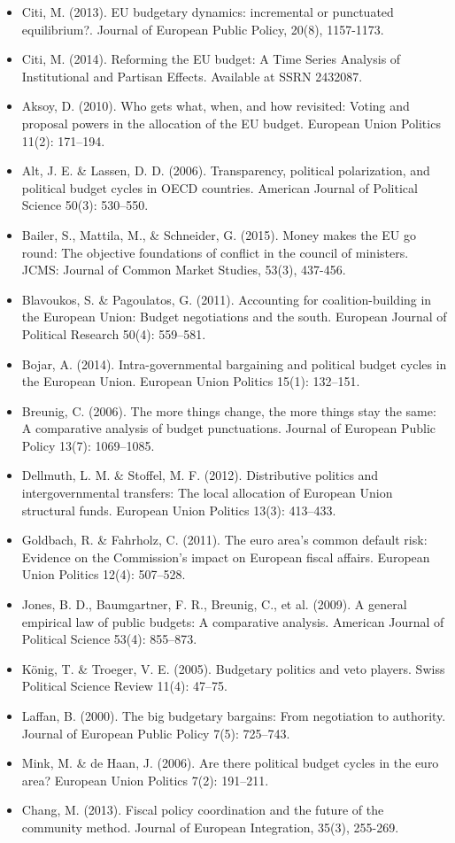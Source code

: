 \begin{itemize}
	\item Citi, M. (2013). EU budgetary dynamics: incremental or punctuated equilibrium?. Journal of European Public Policy, 20(8), 1157-1173.
	\item Citi, M. (2014). Reforming the EU budget: A Time Series Analysis of Institutional and Partisan Effects. Available at SSRN 2432087.
	\item Aksoy, D. (2010). Who gets what, when, and how revisited: Voting and proposal powers in the allocation of the EU budget. European Union Politics 11(2): 171–194.
	\item Alt, J. E. \& Lassen, D. D. (2006). Transparency, political polarization, and political budget cycles in OECD countries. American Journal of Political Science 50(3): 530–550.
	\item Bailer, S., Mattila, M., \& Schneider, G. (2015). Money makes the EU go round: The objective foundations of conflict in the council of ministers. JCMS: Journal of Common Market Studies, 53(3), 437-456.
	\item Blavoukos, S. \& Pagoulatos, G. (2011). Accounting for coalition-building in the European Union: Budget negotiations and the south. European Journal of Political Research 50(4): 559–581.
	\item Bojar, A. (2014). Intra-governmental bargaining and political budget cycles in the European Union. European Union Politics 15(1): 132–151.
	\item Breunig, C. (2006). The more things change, the more things stay the same: A comparative analysis of budget punctuations. Journal of European Public Policy 13(7): 1069–1085.
	\item Dellmuth, L. M. \& Stoffel, M. F. (2012). Distributive politics and intergovernmental transfers: The local allocation of European Union structural funds. European Union Politics 13(3): 413–433.
	\item Goldbach, R. \& Fahrholz, C. (2011). The euro area’s common default risk: Evidence on the Commission’s impact on European fiscal affairs. European Union Politics 12(4): 507–528.
	\item Jones, B. D., Baumgartner, F. R., Breunig, C., et al. (2009). A general empirical law of public budgets: A comparative analysis. American Journal of Political Science 53(4): 855–873.
	\item K{\"o}nig, T. \& Troeger, V. E. (2005). Budgetary politics and veto players. Swiss Political Science Review 11(4): 47–75.
	\item Laffan, B. (2000). The big budgetary bargains: From negotiation to authority. Journal of European Public Policy 7(5): 725–743.
	\item Mink, M. \& de Haan, J. (2006). Are there political budget cycles in the euro area? European Union Politics 7(2): 191–211.
	\item Chang, M. (2013). Fiscal policy coordination and the future of the community method. Journal of European Integration, 35(3), 255-269.
	
\end{itemize}


